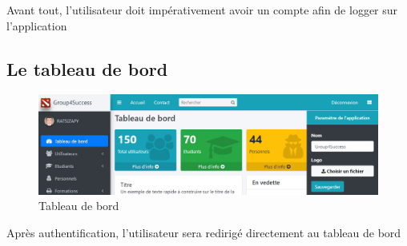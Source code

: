 Avant tout, l'utilisateur doit impérativement avoir un compte afin de logger sur l'application
\clearpage



\subsection{Le tableau de bord}

\begin{figure}[h]
	\centering
	\hspace*{-1.8cm}
	\includegraphics[width=1.2\linewidth]{"Chapitre4/images/dashboard"}
	\caption{Tableau de bord}
	\label{Tableau de bord}
\end{figure}

Après authentification, l’utilisateur sera redirigé directement au tableau de bord 

